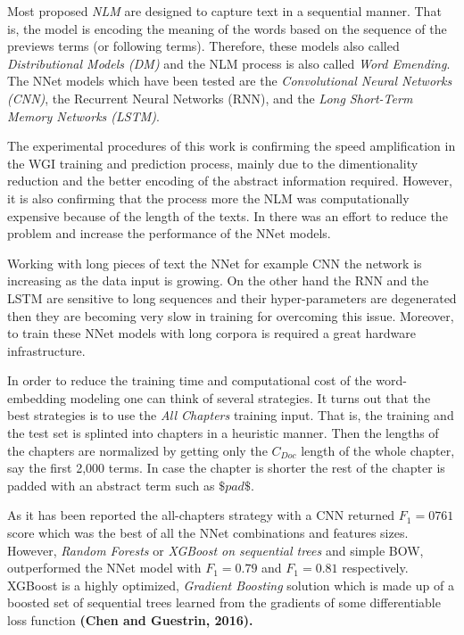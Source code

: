 Most proposed \textit{NLM} are designed to capture text in a sequential manner. That is, the model is encoding the meaning of the words based on the sequence of the previews terms (or following terms). Therefore, these models also called \textit{Distributional Models (DM)} and the NLM process is also called \textit{Word Emending}. The NNet models which have been tested are the \textit{Convolutional Neural Networks (CNN)}, the Recurrent Neural Networks (RNN), and the \textit{Long Short-Term Memory Networks (LSTM)}. 

The experimental procedures of this work is confirming the speed amplification in the WGI training and prediction process, mainly due to the dimentionality reduction and the better encoding of the abstract information required. However, it is also confirming that the process more the NLM was computationally expensive because of the length of the texts. In \parencite{worsham2018genre} there was an effort to reduce the problem and increase the performance of the NNet models.

Working with long pieces of text the NNet for example CNN the network is increasing as the data input is growing. On the other hand the RNN and the LSTM are sensitive to long sequences and their hyper-parameters are degenerated then they are becoming very slow in training for overcoming this issue. Moreover, to train these NNet models with long corpora is required a great hardware infrastructure. 

In order to reduce the training time and computational cost of the word-embedding modeling one can think of several strategies. It turns out that the best strategies is to use the \textit{All Chapters} training input. That is,  the training and the test set is splinted into chapters in a heuristic manner. Then the lengths of the chapters are normalized by getting only the $C_{Doc}$ length of the whole chapter, say the first 2,000 terms. In case the chapter is shorter the rest of the chapter is padded with an abstract term such as $\$pad\$$. 

As it has been reported the all-chapters strategy with a CNN returned $F_{1}=0761$ score which was the best of all the NNet combinations and features sizes. However, \textit{Random Forests} or \textit{XGBoost on sequential trees} and simple BOW, outperformed the NNet model with $F_{1}=0.79$ and $F_{1}=0.81$ respectively. XGBoost is a highly optimized, \textit{Gradient Boosting }solution which is made up of a boosted set of sequential trees learned from the gradients of some differentiable loss function\textbf{ (Chen and Guestrin, 2016).}

